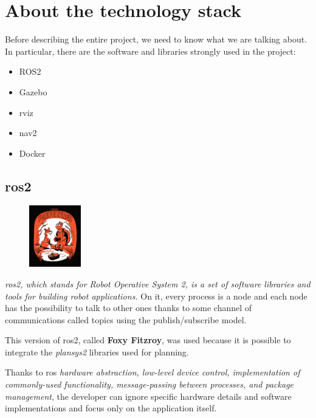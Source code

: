 \chapter{About the technology stack}
\label{cha:techstack}

Before describing the entire project, we need to know what we are talking about. In particular, there are the software and libraries strongly used in the project:  
\begin{itemize}
    \item ROS2
    \item Gazebo
    \item \acrfull{rviz}
    \item \acrfull{nav2}
    \item Docker
\end{itemize}

\section{\acrshort{ros}2}

\begin{figure}
    \includegraphics[width=0.2\textwidth]{images/foxy}
\end{figure}

\textit{\acrshort{ros}2, which stands for Robot Operative System 2, is a set of software libraries and tools for building robot applications.}\cite{ros2desc} On it, every process is a node and each node has the possibility to talk to other ones thanks to some channel of communications called topics using the publish/subscribe model.

This version of \acrshort{ros}2, called \textbf{Foxy Fitzroy}, was used because it is possible to integrate the \textit{plansys2} libraries used for planning.

Thanks to \Acrshort{ros} \textit{hardware abstraction, low-level device control, implementation of commonly-used functionality, message-passing between processes, and package management}\cite{ros2help}, the developer can ignore specific hardware details and software implementations and focus only on the application itself. 

